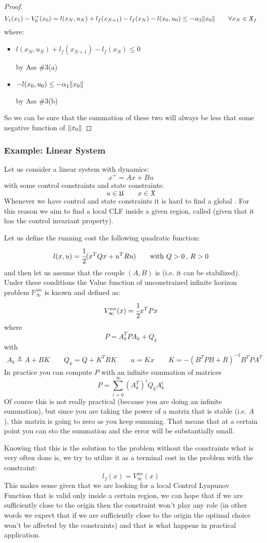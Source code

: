 \begin{proof}
\[V_1(x_1) - V_0^*(x_0)  = l(x_N, u_N) + l_f(x_{N+1}) - l_f(x_N) - l(x_0, u_0) \le -\alpha_3 \lVert x_0\rVert\qquad \forall x_N\in\mathfrak{X}_f\]
where:
\begin{itemize}
\item $l(x_N, u_N) + l_f(x_{N+1}) - l_f(x_N) \le 0$ 

by Ass \#3(a)
\item $- l(x_0, u_0) \le -\alpha_1\lVert x_0\rVert$

by Ass \#3(b)
\end{itemize}
So we can be sure that the summation of these two will always be less that some negative function of $\lVert x_0\rVert$
\end{proof}

\subsubsection{Example: Linear System}
Let us consider a linear system with dynamics:
\[x^+ = Ax + Bu\]
with some control constraints and state constraints:
\[u\in\mathfrak{U} \qquad x\in\mathfrak{X}\]
Whenever we have control and state constraints it is hard to find a global .
For this reason we aim to find a local CLF inside a given region, called  (given that it has the control invariant property).

Let us define the running cost the following quadratic function:
\[l(x,u) = \cfrac{1}{2} (x^TQx + u^TRu)\qquad\text{with } Q>0\,,\,R>0\] 
and then let us assume that the couple $(A, B)$ is  (i.e. it can be stabilized).
Under these conditions the Value function of unconstrained infinite horizon problem $\mathbb{P}_{\infty}^{un}$ is known and defined as:
\[V_{\infty}^{un}(x) = \cfrac{1}{2}x^TPx\]
where 
\[P =A_k^T P A_k + Q_k\]
with
\begin{gather*}
A_k\triangleq A+BK\qquad Q_k=Q+K^TRK \qquad u=Kx \qquad K=-(B^TPB+R)^{-1}B^TPA^T
\end{gather*}
In practice you can compute $P$ with an infinite summation of matrices
\[P = \sum_{i=0}^{\infty} (A_k^T)^iQ_kA_k^i\]
Of course this is not really practical (because you are doing an infinite summation), but since you are taking the power of a matrix that is stable (i.e. $A$), this matrix is going to zero as you keep summing. That means that at a certain point you can sto the summation and the error will be substantially small.

Knowing that this is the solution to the problem without the constraints what is  very often done is, we try to utilize it as a terminal cost in the problem with the constraint:
\[l_f(x) = V_{\infty}^{un}(x)\]
This makes sense given that we are looking for a local Control Lyapunov Function that is valid only inside a certain region, we can hope that if we are sufficiently close to the origin then the constraint won't play any role (in other words we expect that if we are sufficiently close to the origin the optimal choice won't be affected by the constraints) and that is what happens in practical application.

